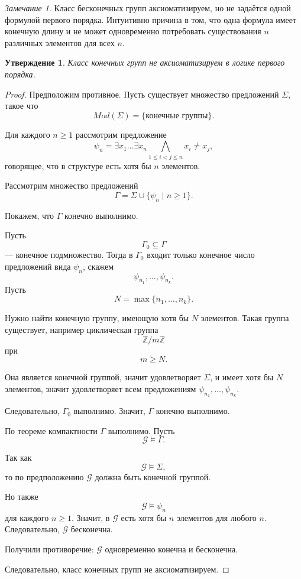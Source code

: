 \documentclass[12pt,a4paper,oneside,openany]{book}
\theoremstyle{definition}
\theoremstyle{plain}
\newtheorem{proposition}{Утверждение}[chapter]
\theoremstyle{remark}
\newtheorem{remark}{Замечание}[chapter]
\begin{document}
\begin{remark}
Класс бесконечных групп аксиоматизируем, но не задаётся одной формулой первого порядка. Интуитивно причина в том, что одна формула имеет конечную длину и не может одновременно потребовать существования $n$ различных элементов для всех $n$.
\end{remark}

\begin{proposition}
Класс конечных групп не аксиоматизируем в логике первого порядка.
\end{proposition}

\begin{proof}
Предположим противное. Пусть существует множество предложений $\Sigma$, такое что
\[
Mod(\Sigma)
=
\{\text{конечные группы}\}.
\]

Для каждого $n\ge 1$ рассмотрим предложение
\[
\psi_n
=
\exists x_1\ldots\exists x_n
\bigwedge_{1\le i<j\le n} x_i\ne x_j,
\]
говорящее, что в структуре есть хотя бы $n$ элементов.

Рассмотрим множество предложений
\[
\Gamma
=
\Sigma\cup\{\psi_n\mid n\ge 1\}.
\]

Покажем, что $\Gamma$ конечно выполнимо.

Пусть
\[
\Gamma_0\subseteq\Gamma
\]
— конечное подмножество. Тогда в $\Gamma_0$ входит только конечное число предложений вида $\psi_n$, скажем
\[
\psi_{n_1},\ldots,\psi_{n_k}.
\]
Пусть
\[
N=\max\{n_1,\ldots,n_k\}.
\]

Нужно найти конечную группу, имеющую хотя бы $N$ элементов. Такая группа существует, например циклическая группа
\[
\mathbb Z/m\mathbb Z
\]
при
\[
m\ge N.
\]

Она является конечной группой, значит удовлетворяет $\Sigma$, и имеет хотя бы $N$ элементов, значит удовлетворяет всем предложениям $\psi_{n_1},\ldots,\psi_{n_k}$.

Следовательно, $\Gamma_0$ выполнимо. Значит, $\Gamma$ конечно выполнимо.

По теореме компактности $\Gamma$ выполнимо. Пусть
\[
\mathcal G\models\Gamma.
\]

Так как
\[
\mathcal G\models\Sigma,
\]
то по предположению $\mathcal G$ должна быть конечной группой.

Но также
\[
\mathcal G\models\psi_n
\]
для каждого $n\ge 1$. Значит, в $\mathcal G$ есть хотя бы $n$ элементов для любого $n$. Следовательно, $\mathcal G$ бесконечна.

Получили противоречие: $\mathcal G$ одновременно конечна и бесконечна.

Следовательно, класс конечных групп не аксиоматизируем.
\end{proof}
\end{document}
